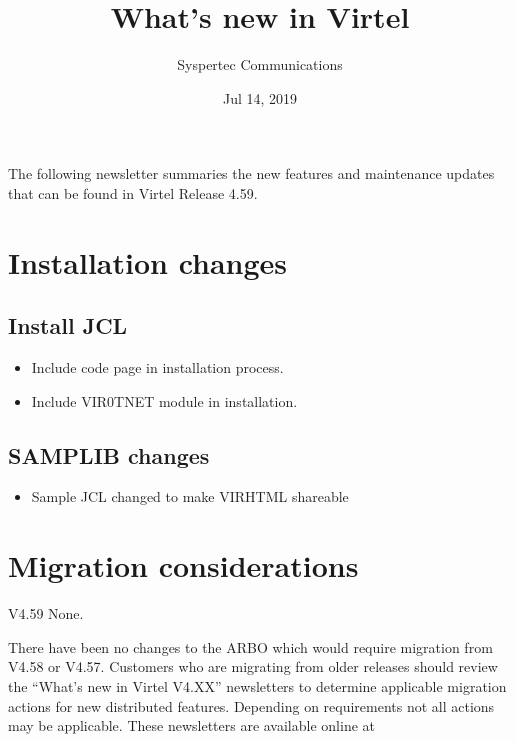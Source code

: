 \documentclass[letterpaper,10pt,english]{sphinxmanual}
\title{What's new in Virtel}
\date{Jul 14, 2019}
\author{Syspertec Communications}
\begin{document}
\pagestyle{empty}
\sphinxmaketitle
\pagestyle{plain}
\sphinxtableofcontents
\pagestyle{normal}
\label{\detokenize{TN201902::doc}}


The following newsletter summaries the new features and maintenance updates that can be found in Virtel Release 4.59.


\chapter{Installation changes}
\label{\detokenize{TN201902:installation-changes}}

\section{Install JCL}
\label{\detokenize{TN201902:install-jcl}}
\begin{itemize}
\item {} 
Include code page in installation process.

\end{itemize}

\begin{itemize}
\item {} 
Include VIR0TNET module in installation.

\end{itemize}


\section{SAMPLIB changes}
\label{\detokenize{TN201902:samplib-changes}}
\begin{itemize}
\item {} 
Sample JCL changed to make VIRHTML shareable

\end{itemize}


\chapter{Migration considerations}
\label{\detokenize{TN201902:migration-considerations}}
V4.59 None.

There have been no changes to the ARBO which would require migration from V4.58 or V4.57. Customers who are migrating from older releases should review the
“What’s new in Virtel V4.XX” newsletters to determine applicable migration actions for new distributed features.
Depending on requirements not all actions may be applicable. These newsletters are available online at 
\end{document}
